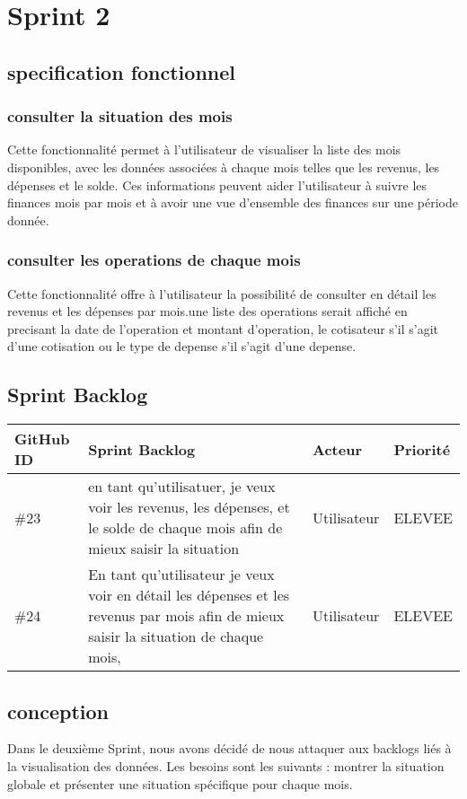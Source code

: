 \section{Sprint 2}
\subsection{specification fonctionnel}
\subsubsection{consulter la situation des mois}
Cette fonctionnalité permet à l'utilisateur de visualiser la liste des mois disponibles, avec les données associées à chaque mois telles que les revenus, les dépenses et le solde. Ces informations peuvent aider l'utilisateur à suivre les finances mois par mois et à avoir une vue d'ensemble des finances sur une période donnée.
\subsubsection{consulter les operations de chaque mois}
Cette fonctionnalité offre à l'utilisateur la possibilité de consulter en détail les revenus et les dépenses par mois.une liste des operations serait affiché en precisant la date de l'operation et montant d'operation, le cotisateur s'il s'agit d'une cotisation ou le type de depense s'il s'agit d'une depense.

\subsection{Sprint Backlog}
\begin{center}
  \begin{tabular}{ | m{1cm} | m{9cm}| m{2cm} | m{2cm} |} 
   \hline
   GitHub ID & Sprint Backlog & Acteur & Priorité \\ [0.5ex] 
   \hline\hline
   \#23 & en tant qu'utilisatuer, je veux voir les revenus, les dépenses, et le solde de chaque mois afin de mieux saisir la situation & Utilisateur & ELEVEE \\ 
   \hline
   \#24  & En tant qu'utilisateur je veux voir en détail les dépenses et les revenus par mois afin de mieux saisir la situation de chaque mois, & Utilisateur & ELEVEE \\
   \hline
  \end{tabular}
\end{center}
\subsection{conception}
Dans le deuxième Sprint, nous avons décidé de nous attaquer aux backlogs liés à la visualisation des données. Les besoins sont les suivants : montrer la situation globale et présenter une situation spécifique pour chaque mois.
